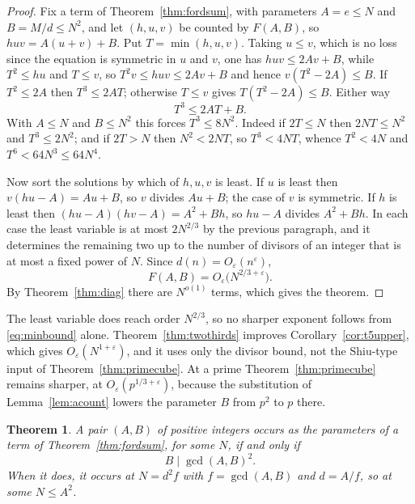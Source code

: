 \documentclass[11pt]{article}
\theoremstyle{plain}
\newtheorem{theorem}{Theorem}[section]
\theoremstyle{definition}
\begin{document}
\begin{proof}
Fix a term of Theorem~\ref{thm:fordsum}, with parameters $A=e\le N$ and $B=M/d\le N^2$,
and let $(h,u,v)$ be counted by $F(A,B)$, so $huv=A(u+v)+B$. Put $T=\min(h,u,v)$. Taking
$u\le v$, which is no loss since the equation is symmetric in $u$ and $v$, one has
$huv\le 2Av+B$, while $T^2\le hu$ and $T\le v$, so $T^2v\le huv\le 2Av+B$ and hence
$v(T^2-2A)\le B$. If $T^2\le 2A$ then $T^3\le 2AT$; otherwise $T\le v$ gives
$T(T^2-2A)\le B$. Either way
\begin{equation}\label{eq:minbound}
  T^{3}\le 2AT+B .
\end{equation}
With $A\le N$ and $B\le N^2$ this forces $T^3\le 8N^2$. Indeed if $2T\le N$ then
$2NT\le N^2$ and $T^3\le 2N^2$; and if $2T>N$ then $N^2<2NT$, so $T^3<4NT$, whence
$T^2<4N$ and $T^6<64N^3\le 64N^4$.

Now sort the solutions by which of $h,u,v$ is least. If $u$ is least then
$v(hu-A)=Au+B$, so $v$ divides $Au+B$; the case of $v$ is symmetric. If $h$ is least then
$(hu-A)(hv-A)=A^2+Bh$, so $hu-A$ divides $A^2+Bh$. In each case the least variable is at
most $2N^{2/3}$ by the previous paragraph, and it determines the remaining two up to the
number of divisors of an integer that is at most a fixed power of $N$. Since
$d(n)=O_\varepsilon(n^{\varepsilon})$,
\[
  F(A,B)=O_\varepsilon\bigl(N^{2/3+\varepsilon}\bigr).
\]
By Theorem~\ref{thm:diag} there are $N^{o(1)}$ terms, which gives the theorem.
\end{proof}

The least variable does reach order $N^{2/3}$, so no sharper exponent follows from
\eqref{eq:minbound} alone.
Theorem~\ref{thm:twothirds} improves Corollary~\ref{cor:t5upper}, which gives
$O_\varepsilon(N^{1+\varepsilon})$, and it uses only the divisor bound, not the
Shiu-type input of Theorem~\ref{thm:primecube}. At a prime Theorem~\ref{thm:primecube}
remains sharper, at $O_\varepsilon(p^{1/3+\varepsilon})$, because the substitution of
Lemma~\ref{lem:acount} lowers the parameter $B$ from $p^2$ to $p$ there.

\begin{theorem}\label{thm:params}
A pair $(A,B)$ of positive integers occurs as the parameters of a term of
Theorem~\ref{thm:fordsum}, for some $N$, if and only if
\[
  B\mid\gcd(A,B)^{2}.
\]
When it does, it occurs at $N=d^{2}f$ with $f=\gcd(A,B)$ and $d=A/f$, so at some
$N\le A^{2}$.
\end{theorem}
\end{document}
